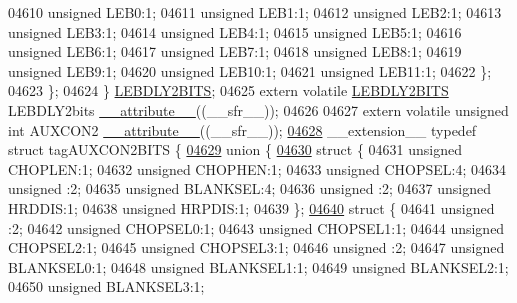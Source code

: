 \begin{DoxyCode}
04610       \textcolor{keywordtype}{unsigned} LEB0:1;
04611       \textcolor{keywordtype}{unsigned} LEB1:1;
04612       \textcolor{keywordtype}{unsigned} LEB2:1;
04613       \textcolor{keywordtype}{unsigned} LEB3:1;
04614       \textcolor{keywordtype}{unsigned} LEB4:1;
04615       \textcolor{keywordtype}{unsigned} LEB5:1;
04616       \textcolor{keywordtype}{unsigned} LEB6:1;
04617       \textcolor{keywordtype}{unsigned} LEB7:1;
04618       \textcolor{keywordtype}{unsigned} LEB8:1;
04619       \textcolor{keywordtype}{unsigned} LEB9:1;
04620       \textcolor{keywordtype}{unsigned} LEB10:1;
04621       \textcolor{keywordtype}{unsigned} LEB11:1;
04622     \};
04623   \};
04624 \} \hyperlink{a00008_de/d7c/a00576}{LEBDLY2BITS};
04625 \textcolor{keyword}{extern} \textcolor{keyword}{volatile} \hyperlink{a00008_de/d7c/a00576}{LEBDLY2BITS} LEBDLY2bits \hyperlink{a00009_a493c46f03454991ccc5aa7a6e1dfb2a7}{\_\_attribute\_\_}((\_\_sfr\_\_));
04626 
04627 \textcolor{keyword}{extern} \textcolor{keyword}{volatile} \textcolor{keywordtype}{unsigned} \textcolor{keywordtype}{int}  AUXCON2 \hyperlink{a00009_a493c46f03454991ccc5aa7a6e1dfb2a7}{\_\_attribute\_\_}((\_\_sfr\_\_));
\hypertarget{a00009_source_l04628}{}\hyperlink{a00008}{04628} \_\_extension\_\_ \textcolor{keyword}{typedef} \textcolor{keyword}{struct }tagAUXCON2BITS \{
\hypertarget{a00009_source_l04629}{}\hyperlink{a00009}{04629}   \textcolor{keyword}{union }\{
\hypertarget{a00009_source_l04630}{}\hyperlink{a00009}{04630}     \textcolor{keyword}{struct }\{
04631       \textcolor{keywordtype}{unsigned} CHOPLEN:1;
04632       \textcolor{keywordtype}{unsigned} CHOPHEN:1;
04633       \textcolor{keywordtype}{unsigned} CHOPSEL:4;
04634       \textcolor{keywordtype}{unsigned} :2;
04635       \textcolor{keywordtype}{unsigned} BLANKSEL:4;
04636       \textcolor{keywordtype}{unsigned} :2;
04637       \textcolor{keywordtype}{unsigned} HRDDIS:1;
04638       \textcolor{keywordtype}{unsigned} HRPDIS:1;
04639     \};
\hypertarget{a00009_source_l04640}{}\hyperlink{a00009}{04640}     \textcolor{keyword}{struct }\{
04641       \textcolor{keywordtype}{unsigned} :2;
04642       \textcolor{keywordtype}{unsigned} CHOPSEL0:1;
04643       \textcolor{keywordtype}{unsigned} CHOPSEL1:1;
04644       \textcolor{keywordtype}{unsigned} CHOPSEL2:1;
04645       \textcolor{keywordtype}{unsigned} CHOPSEL3:1;
04646       \textcolor{keywordtype}{unsigned} :2;
04647       \textcolor{keywordtype}{unsigned} BLANKSEL0:1;
04648       \textcolor{keywordtype}{unsigned} BLANKSEL1:1;
04649       \textcolor{keywordtype}{unsigned} BLANKSEL2:1;
04650       \textcolor{keywordtype}{unsigned} BLANKSEL3:1;

\end{DoxyCode}
